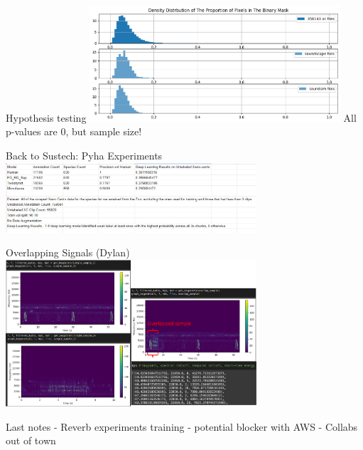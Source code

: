 \begin{frame}{Hypothesis testing}
    \centering
    \includegraphics[height=0.7\textheight,width=0.7\textwidth,keepaspectratio]{images/AID/output2.png}
    All p-values are 0, but sample size!
\end{frame}

\begin{frame}{Back to Sustech: Pyha Experiments}
    \centering
    \includegraphics[height=0.7\textheight,width=0.7\textwidth,keepaspectratio]{images/AID/sustech_results.png}
\end{frame}

\begin{frame}{Overlapping Signals (Dylan)}
    \centering
    \includegraphics[height=0.7\textheight,width=0.7\textwidth,keepaspectratio]{images/AID/dylan-02-21.png}
\end{frame}

\begin{frame}{Last notes}
    - Reverb experiments training
    - potential blocker with AWS
    - Collabs out of town
\end{frame}
